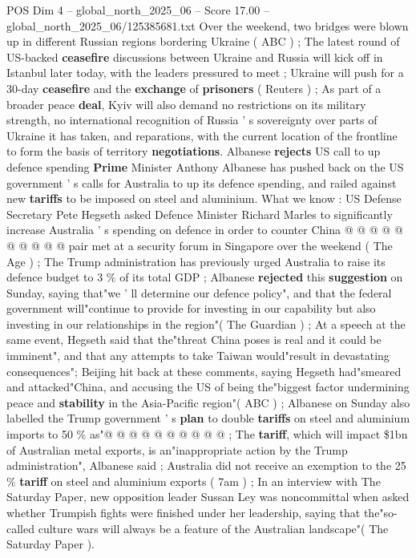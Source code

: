 \begin{textsample}{POS Dim 4 – global\_north\_2025\_06 – Score 17.00 – global\_north\_2025\_06/125385681.txt}  \label{ex:f4_pos_400}
Over the weekend, two bridges were blown up in different Russian regions bordering Ukraine ( ABC ) ; The latest round of US-backed \textbf{ceasefire} discussions between Ukraine and Russia will kick off in Istanbul later today, with the leaders pressured to meet ; Ukraine will push for a 30-day \textbf{ceasefire} and the \textbf{exchange} of \textbf{prisoners} ( Reuters ) ; As part of a broader peace \textbf{deal}, Kyiv will also demand no restrictions on its military strength, no international recognition of Russia ' s sovereignty over parts of Ukraine it has taken, and reparations, with the current location of the frontline to form the basis of territory \textbf{negotiations}.
Albanese \textbf{rejects} US call to up defence spending \textbf{Prime} Minister Anthony Albanese has pushed back on the US government ' s calls for Australia to up its defence spending, and railed against new \textbf{tariffs} to be imposed on steel and aluminium.
What we know : US Defense Secretary Pete Hegseth asked Defence Minister Richard Marles to significantly increase Australia ' s spending on defence in order to counter China @ @ @ @ @ @ @ @ @ @ pair met at a security forum in Singapore over the weekend ( The Age ) ; The Trump administration has previously urged Australia to raise its defence budget to 3 \% of its total GDP ; Albanese \textbf{rejected} this \textbf{suggestion} on Sunday, saying that"we ' ll determine our defence policy", and that the federal government will"continue to provide for investing in our capability but also investing in our relationships in the region"( The Guardian ) ; At a speech at the same event, Hegseth said that the"threat China poses is real and it could be imminent", and that any attempts to take Taiwan would"result in devastating consequences"; Beijing hit back at these comments, saying Hegseth had"smeared and attacked"China, and accusing the US of being the"biggest factor undermining peace and \textbf{stability} in the Asia-Pacific region"( ABC ) ; Albanese on Sunday also labelled the Trump government ' s \textbf{plan} to double \textbf{tariffs} on steel and aluminium imports to 50 \% as"@ @ @ @ @ @ @ @ @ @ ; The \textbf{tariff}, which will impact \$1bn of Australian metal exports, is an"inappropriate action by the Trump administration", Albanese said ; Australia did not receive an exemption to the 25 \% \textbf{tariff} on steel and aluminium exports ( 7am ) ; In an interview with The Saturday Paper, new opposition leader Sussan Ley was noncommittal when asked whether Trumpish fights were finished under her leadership, saying that the"so-called culture wars will always be a feature of the Australian landscape"( The Saturday Paper ).

\end{textsample}
